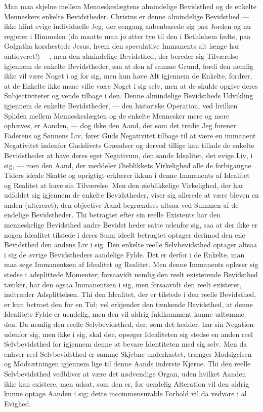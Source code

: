 \documentclass[12pt]{book}
\newcommand{\opage}[1]{\marginnote{\footnotesize\textit{[#1]}}}
\begin{document}
Man maa skjelne mellem Menneskeslægtens almindelige Bevidsthed og de enkelte
Menneskers enkelte Bevidstheder. Christus er denne almindelige Bevidsthed ---
ikke hiint evige individuelle Jeg, der eengang aabenbarede sig paa Jorden og nu
regjerer i Himmelen (da maatte man jo atter tye til den i Bethlehem fødte, paa
Golgatha korsfæstede Jesus, hvem den speculative Immanents alt længe har
antiqveret!) ---, men den almindelige Bevidsthed, der bereder sig Tilværelse
igjennem de enkelte Bevidstheder, saa at den af samme Grund, fordi den nemlig
ikke vil være Noget i og for sig, men kun have Alt igjennem de Enkelte, fordrer,
at de Enkelte ikke maae ville være Noget i sig selv, men at de skulde opgive
deres Subjectiviteter og vende tilbage i den. Denne almindelige Bevidstheds
Udvikling igjennem de enkelte Bevidstheder, --- den historiske Operation, ved
hvilken Spliden mellem Menneskeslægten og de enkelte Mennesker mere og mere
ophæves, er Aanden, --- dog ikke den Aand, der som det tredie Jeg forener
Faderens og Sønnens Liv, fører Guds Negativitet tilbage til at være en immanent
Negativitet indenfor Gudslivets Grændser og derved tillige kan tillade de
enkelte Bevidstheder at have deres eget Negativum, den sande Idealitet, det
evige Liv, i sig, --- men den Aand, der meddeler Øieblikkets Virkelighed alle de
forbigangne Tiders ideale Skatte og oprigtigt erklærer ikkun i denne Immanents
af Idealitet og Realitet at have sin Tilværelse. Men den øieblikkelige
Virkelighed, der har udfoldet sig igjennem de enkelte Bevidstheder, viser sig
allerede at være bleven en anden (altereret); den objective Aand begrændses
altsaa ved Summen af de endelige Bevidstheder. Thi betragtet efter sin reelle
Existents har den menneskelige Bevidsthed andre Bevidst\-%
\opage{141}heder satte udenfor sig, saa at der ikke er nogen Idealitet tilstede i deres
Sum; ideelt betragtet optager derimod den ene Bevidsthed den andens Liv i sig.
Den enkelte reelle Selvbevidsthed optager altsaa i sig de øvrige Bevidstheders
aandelige Fylde. Det er derfor i de Enkelte, man maa søge Immanentsen af
Idealitet og Realitet. Men denne Immanents opløser sig stedse i adsplittede
Momenter; forsaavidt nemlig den reelt existerende Bevidsthed tænker, har den
ogsaa Immanentsen i sig, men forsaavidt den reelt existerer, indtræder
Adsplittelsen. Thi den Idealitet, der er tilstede i den reelle Bevidsthed, er
kun betroet den for en Tid; vel erkjender den tænkende Bevidsthed, at denne
Idealitets Fylde er uendelig, men den vil aldrig fuldkomment kunne udtømme den.
Da nemlig den reelle Selvbevidsthed, der, som det hedder, har sin Negation
udenfor sig, men ikke i sig, skal døe, opsøger Idealiteten sig stedse en anden
reel Selvbevidsthed for igjennem denne at bevare Identiteten med sig selv. Men
da enhver reel Selvbevidsthed er samme Skjebne underkastet, trænger Modsigelsen
og Modsætningen igjennem lige til denne Aands inderste Kjerne. Thi den reelle
Selvbevidsthed vedbliver at være det nødvendige Organ, uden hvilket Aanden ikke
kan existere, men udsat, som den er, for uendelig Alteration vil den aldrig
kunne optage Aanden i sig; dette incommensurable Forhold vil da vedvare i al
Evighed.
\end{document}
